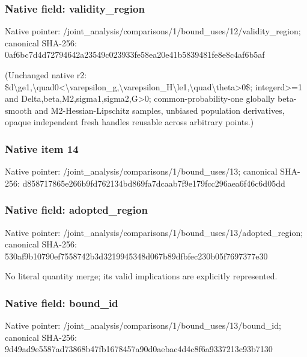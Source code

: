 \documentclass[10pt,a4paper]{article}
\begin{document}
\subsubsection{Native field: validity\_\allowbreak{}region}
Native pointer: /joint\_\allowbreak{}analysis/comparisons/1/bound\_\allowbreak{}uses/12/validity\_\allowbreak{}region; canonical SHA-256: 0af6bc7d4d72794642a23549c023933fe58ea20e41b5839481fe8e8c4af6b5af

\begingroup\raggedright\sloppy (Unchanged native r2:\allowbreak{} \$d\textbackslash{}ge1,\allowbreak{}\textbackslash{}quad0<\textbackslash{}varepsilon\_\allowbreak{}g,\allowbreak{}\textbackslash{}varepsilon\_\allowbreak{}H\textbackslash{}le1,\allowbreak{}\textbackslash{}quad\textbackslash{}theta>0\$;\allowbreak{} integerd>=\allowbreak{}1 and Delta,\allowbreak{}beta,\allowbreak{}M2,\allowbreak{}sigma1,\allowbreak{}sigma2,\allowbreak{}G>0;\allowbreak{} common-probability-one globally beta-smooth and M2-Hessian-Lipschitz samples,\allowbreak{} unbiased population derivatives,\allowbreak{} opaque independent fresh handles reusable across arbitrary points.)\par\endgroup

\subsubsection{Native item 14}
Native pointer: /joint\_\allowbreak{}analysis/comparisons/1/bound\_\allowbreak{}uses/13; canonical SHA-256: d858717865e266b9fd762134bd869fa7dcaab7f9e179fcc296aea6f46c6d05dd

\subsubsection{Native field: adopted\_\allowbreak{}region}
Native pointer: /joint\_\allowbreak{}analysis/comparisons/1/bound\_\allowbreak{}uses/13/adopted\_\allowbreak{}region; canonical SHA-256: 530af9b10790ef7558742b3d3219945348d067b89dfbfec230b05f7697377e30

\begingroup\raggedright\sloppy No literal quantity merge;\allowbreak{} its valid implications are explicitly represented.\par\endgroup

\subsubsection{Native field: bound\_\allowbreak{}id}
Native pointer: /joint\_\allowbreak{}analysis/comparisons/1/bound\_\allowbreak{}uses/13/bound\_\allowbreak{}id; canonical SHA-256: 9d49ad9e5587ad73868b47fb1678457a90d0aebac4d4c8f6a9337213c93b7130
\end{document}

